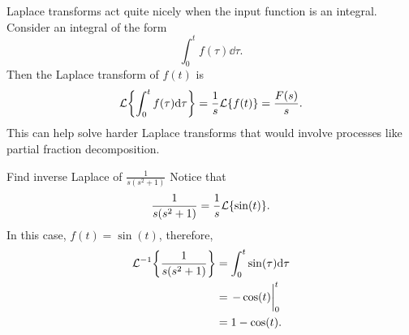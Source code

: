 \documentclass[../notes.tex]{subfiles}
\begin{document}
Laplace transforms act quite nicely when the input function is an integral. Consider an integral of the form
 \[
     \int_0^{t} f(\tau) \dd\tau
.\]
Then the Laplace transform of $f(t)$ is
 \[
\mathcal{L}\qty{ \int_0^{t} f(\tau) \dd\tau } = \frac{1}{s} \mathcal{L}\qty{ f(t) } = \frac{F(s)}{s}
.\]
This can help solve harder Laplace transforms that would involve processes like partial fraction decomposition.

\begin{example}{Find inverse Laplace of $\frac{1}{s(s^2+1)}$}
    Notice that
    \[
    \frac{1}{s(s^2+1)} = \frac{1}{s} \mathcal{L}\qty{ \sin(t) }
    .\]
    In this case, $f(t) = \sin(t)$, therefore,
    \begin{align*}
        \invlaplace{\frac{1}{s(s^2+1)}} &= \int_0^{t} \sin(\tau) \dd\tau \\
                                        &= \eval{-\cos(t)}_0^{t} \\
                                        &= 1-\cos(t)
    .\end{align*}
\end{example}
\end{document}
